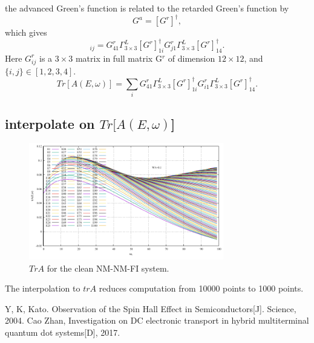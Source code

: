 \documentclass[aps,prb,onecolumn,amssymb,amsmath,superscriptaddress]{revtex4-1}
\begin{document}
the advanced Green's function is related to the retarded Green's function by
\begin{equation}
G^{a} = [G^{r}]^{\dag},
\end{equation}
which gives
\begin{equation}
[A(E, \omega)]_{ij} = G_{41}^{r}\Gamma_{3\times3}^{L}[G^{r}]_{1i}^{\dag} G^{r}_{j1}\Gamma_{3\times3}^{L}[G^{r}]_{14}^{\dag}.
\end{equation}
Here $G_{ij}^{r}$ is a $3\times 3$ matrix in full matrix G$^{r}$ of dimension $12\times12$, and $\{i, j\}\in [1,2,3,4]$.
\begin{equation}
Tr[A(E, \omega)] = \sum_{i}G_{41}^{r}\Gamma_{3\times3}^{L}[G^{r}]_{1i}^{\dag} G^{r}_{i1}\Gamma_{3\times3}^{L}[G^{r}]_{14}^{\dag}.
\end{equation}

\subsection{interpolate on $Tr[A(E,\omega)$]}

\begin{figure}
\includegraphics[width=8.5cm]{trA.pdf}
\caption{\label{fig:trA} $TrA$ for the clean NM-NM-FI system.}
\end{figure}

The interpolation to $trA$ reduces computation from 10000 points to 1000 points.








\begin{thebibliography}{10}
Y, K, Kato. Observation of the Spin Hall Effect in Semiconductors[J]. Science, 2004.
Cao Zhan, Investigation on DC electronic transport in hybrid multiterminal quantum dot systems[D], 2017.
\end{thebibliography}
\end{document}
